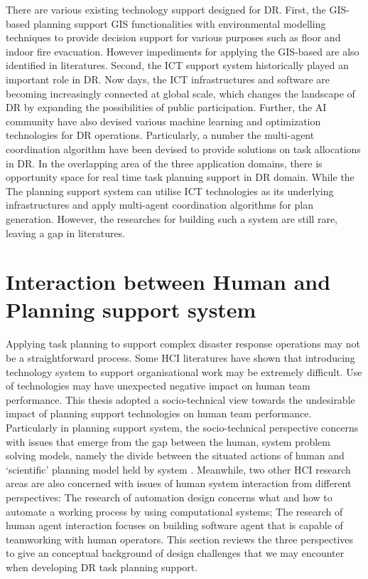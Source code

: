 There are various existing technology support designed for \ac{DR}. First, the \ac{GIS}-based planning support \ac{GIS} functionalities with environmental modelling techniques to provide decision support for various purposes such as floor and indoor fire evacuation. However impediments for applying the \ac{GIS}-based are also identified in literatures. Second, the \ac{ICT} support system historically played an important role in \ac{DR}. Now days, the \ac{ICT} infrastructures and software are becoming increasingly connected at global scale, which changes the landscape of \ac{DR} by expanding the possibilities of public participation. Further, the \ac{AI} community have also devised various machine learning and optimization technologies for \ac{DR} operations. Particularly, a number the multi-agent coordination algorithm have been devised to provide solutions on task allocations in \ac{DR}. In the overlapping area of the three application domains, there is opportunity space for real time task planning support in \ac{DR} domain. While the The planning support system can utilise \ac{ICT} technologies as its underlying infrastructures and apply multi-agent coordination algorithms for plan generation. However, the researches for building such a system are still rare, leaving a gap in literatures.\\

\chapter{Interaction between Human and Planning support system}\label{ch:humanSysRelationship}

Applying task planning to support complex disaster response operations may not be a straightforward process. Some \ac{HCI} literatures \cite{Ackerman2000,Bowers1994,Niazkhani2009} have shown that introducing technology system to support organisational work may be extremely difficult. Use of technologies may have unexpected negative impact on human team performance. This thesis adopted a socio-technical view towards the undesirable impact of planning support technologies on human team performance. Particularly in planning support system, the socio-technical perspective concerns with issues that emerge from the gap between the human, system problem solving models, namely the divide between the situated actions of human and `scientific' planning model held by system \cite{Suchman1987}. Meanwhile, two other \ac{HCI} research areas are also concerned with issues of human system interaction from different perspectives: The research of automation design concerns what and how to automate a working process by using computational systems; The research of human agent interaction focuses on building software agent that is capable of teamworking with human operators. This section reviews the three perspectives to give an conceptual background of design challenges that we may encounter when developing \ac{DR} task planning support.\\

